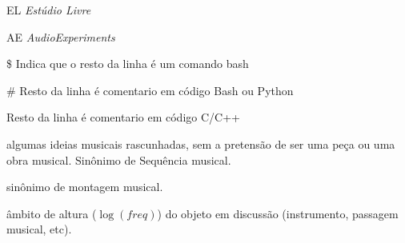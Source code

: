 \begin{listaespecial}[BIGNAMEWIDTH]
		\item[EL] \emph{Estúdio Livre}
		\item[AE] \emph{AudioExperiments}
	\end{listaespecial} 

	\begin{listaespecial}[BIGNAMEWIDTH]
		\item[\$] Indica que o resto da linha é um comando bash
		\item[\#] Resto da linha é comentario em código Bash ou Python
		\item[] Resto da linha é comentario em código C/C++
	\end{listaespecial} 

	\begin{listaespecial2}[BIGNAMEWIDTH]
		\item[Montagem musical :] algumas ideias musicais rascunhadas, sem a pretensão de ser uma peça ou uma obra musical. Sinônimo de Sequência musical.
		\item[Sequência musical :] sinônimo de montagem musical. 
		\item[Tessitura :] âmbito de altura ($\log(freq)$) do objeto em discussão (instrumento, passagem musical, etc).
	\end{listaespecial2} 


\sumario

